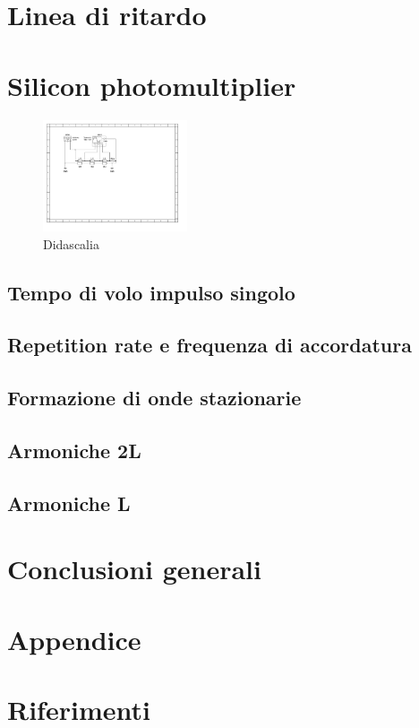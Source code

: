 \documentclass[journal]{IEEEtran}
\begin{document}
\section{Linea di ritardo} %

\section{Silicon photomultiplier} %

\begin{figure}[H]%
\begin {center}
\includegraphics[width=0.38\textwidth]{sch-simulations/output/Transmission line.pdf}
\caption{Didascalia}
\label{fig:oscilloscope}
\end {center}
\end{figure}

\subsection{Tempo di volo impulso singolo}

\subsection{Repetition rate e frequenza di accordatura}

\subsection{Formazione di onde stazionarie}

\subsection{Armoniche 2L}

\subsection{Armoniche L}

\section{Conclusioni generali} %


\section{Appendice}


\section{Riferimenti}

\printbibliography
\end{document}
